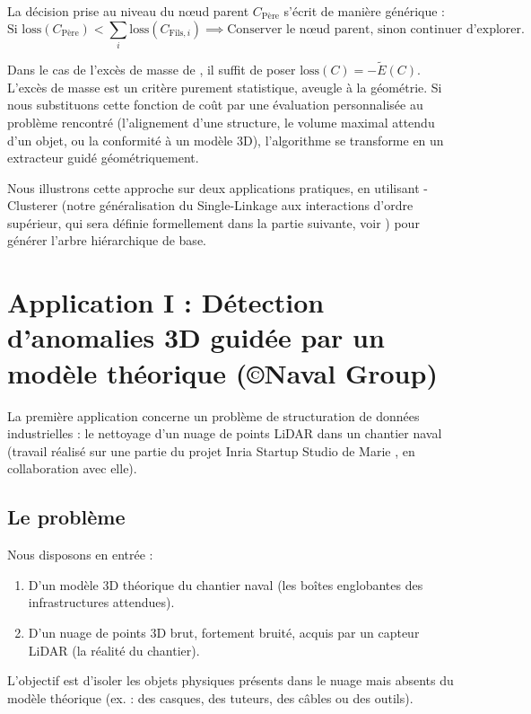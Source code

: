 La décision prise au niveau du nœud parent $C_{\mathrm{Père}}$ s'écrit de manière générique :
\[
    \text{Si } \mathrm{loss}(C_{\mathrm{Père}}) < \sum_{i} \mathrm{loss}(C_{\mathrm{Fils}, i}) \implies \text{Conserver le nœud parent, sinon continuer d'explorer.}
\]

Dans le cas de l'excès de masse de \HDBSCAN, il suffit de poser $ \mathrm{loss}(C) = - \tilde E(C)$.
L'excès de masse est un critère purement statistique, aveugle à la géométrie. Si nous substituons cette fonction de coût par une évaluation personnalisée au problème rencontré (l'alignement d'une structure, le volume maximal attendu d'un objet, ou la conformité à un modèle 3D), l'algorithme se transforme en un extracteur guidé géométriquement. 

Nous illustrons cette approche sur deux applications pratiques, en utilisant {\HGP-Clusterer} (notre généralisation du Single-Linkage aux interactions d'ordre supérieur, qui sera définie formellement dans la partie suivante, voir ) pour générer l'arbre hiérarchique de base.


\section{Application I : Détection d'anomalies 3D guidée par un modèle théorique (\copyright Naval Group)}

La première application concerne un problème de structuration de données industrielles : le nettoyage d'un nuage de points LiDAR dans un chantier naval (travail réalisé sur une partie du projet Inria Startup Studio de Marie , en collaboration avec elle).

\subsection{Le problème}
Nous disposons en entrée :
\begin{enumerate}
    \item D'un modèle 3D théorique du chantier naval (les boîtes englobantes des infrastructures attendues).
    \item D'un nuage de points 3D brut, fortement bruité, acquis par un capteur LiDAR (la réalité du chantier).
\end{enumerate}
L'objectif est d'isoler les objets physiques présents dans le nuage mais absents du modèle théorique (ex. : des casques, des tuteurs, des câbles ou des outils). 


